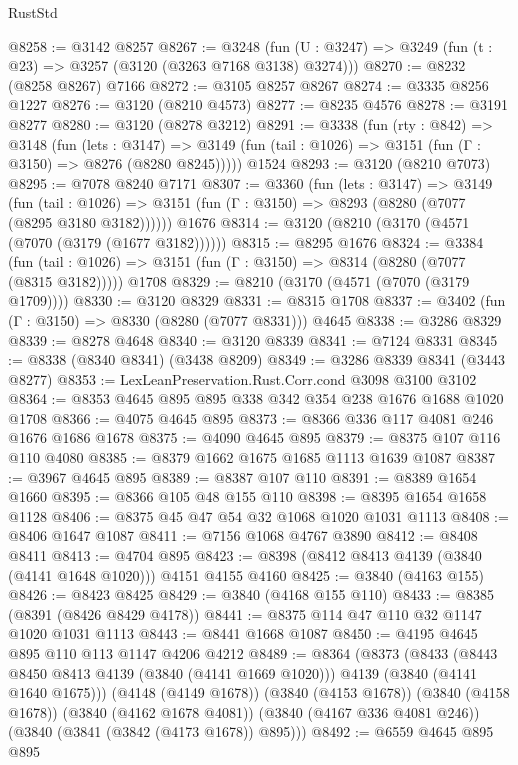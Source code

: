 \begin{lexlean}{RustStd}
\begin{coremodule}
@8258 := @3142 @8257
@8267 := @3248 (fun (U : @3247) => @3249 (fun (t : @23) => @3257 (@3120 (@3263 @7168 @3138) @3274)))
@8270 := @8232 (@8258 @8267) @7166
@8272 := @3105 @8257 @8267
@8274 := @3335 @8256 @1227
@8276 := @3120 (@8210 @4573)
@8277 := @8235 @4576
@8278 := @3191 @8277
@8280 := @3120 (@8278 @3212)
@8291 := @3338
    (fun (rty : @842) =>
    @3148
      (fun (lets : @3147) =>
      @3149 (fun (tail : @1026) => @3151 (fun (Γ : @3150) => @8276 (@8280 @8245)))))
    @1524
@8293 := @3120 (@8210 @7073)
@8295 := @7078 @8240 @7171
@8307 := @3360
    (fun (lets : @3147) =>
    @3149
      (fun (tail : @1026) => @3151 (fun (Γ : @3150) => @8293 (@8280 (@7077 (@8295 @3180 @3182))))))
    @1676
@8314 := @3120 (@8210 (@3170 (@4571 (@7070 (@3179 (@1677 @3182))))))
@8315 := @8295 @1676
@8324 := @3384
    (fun (tail : @1026) => @3151 (fun (Γ : @3150) => @8314 (@8280 (@7077 (@8315 @3182)))))
    @1708
@8329 := @8210 (@3170 (@4571 (@7070 (@3179 @1709))))
@8330 := @3120 @8329
@8331 := @8315 @1708
@8337 := @3402 (fun (Γ : @3150) => @8330 (@8280 (@7077 @8331))) @4645
@8338 := @3286 @8329
@8339 := @8278 @4648
@8340 := @3120 @8339
@8341 := @7124 @8331
@8345 := @8338 (@8340 @8341) (@3438 @8209)
@8349 := @3286 @8339 @8341 (@3443 @8277)
@8353 := LexLeanPreservation.Rust.Corr.cond @3098 @3100 @3102
@8364 := @8353 @4645 @895 @895 @338 @342 @354 @238 @1676 @1688 @1020 @1708
@8366 := @4075 @4645 @895
@8373 := @8366 @336 @117 @4081 @246 @1676 @1686 @1678
@8375 := @4090 @4645 @895
@8379 := @8375 @107 @116 @110 @4080
@8385 := @8379 @1662 @1675 @1685 @1113 @1639 @1087
@8387 := @3967 @4645 @895
@8389 := @8387 @107 @110
@8391 := @8389 @1654 @1660
@8395 := @8366 @105 @48 @155 @110
@8398 := @8395 @1654 @1658 @1128
@8406 := @8375 @45 @47 @54 @32 @1068 @1020 @1031 @1113
@8408 := @8406 @1647 @1087
@8411 := @7156 @1068 @4767 @3890
@8412 := @8408 @8411
@8413 := @4704 @895
@8423 := @8398 (@8412 @8413 @4139 (@3840 (@4141 @1648 @1020))) @4151 @4155 @4160
@8425 := @3840 (@4163 @155)
@8426 := @8423 @8425
@8429 := @3840 (@4168 @155 @110)
@8433 := @8385 (@8391 (@8426 @8429 @4178))
@8441 := @8375 @114 @47 @110 @32 @1147 @1020 @1031 @1113
@8443 := @8441 @1668 @1087
@8450 := @4195 @4645 @895 @110 @113 @1147 @4206 @4212
@8489 := @8364
    (@8373
      (@8433
        (@8443 @8450 @8413 @4139 (@3840 (@4141 @1669 @1020)))
        @4139
        (@3840 (@4141 @1640 @1675)))
      (@4148 (@4149 @1678))
      (@3840 (@4153 @1678))
      (@3840 (@4158 @1678))
      (@3840 (@4162 @1678 @4081))
      (@3840 (@4167 @336 @4081 @246))
      (@3840 (@3841 (@3842 (@4173 @1678)) @895)))
@8492 := @6559 @4645 @895 @895

\end{coremodule}
\end{lexlean}
